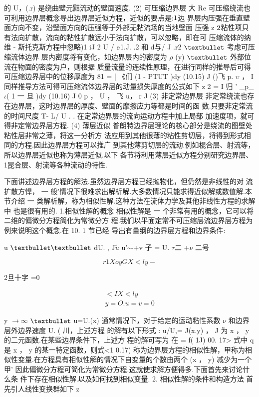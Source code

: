 的 U，(.r) 是绕曲壁元黠流动的壁面速度. (2) 可压缩边界层 大 Re 可压缩绕流也可利用边界层概念导出边界层近似方程，近似的要点是:${\rm 1}$边 界层内压强在垂直壁面方向不变，沿壁面方向的压强等于外部无粘流场的当地壁面 压强 z ${\rm 2}$粘性项只有法向扩散，流向的粘性扩散远小于法向扩散，可以忽略，即在可 压缩流体的纳维 - 斯托克斯方程中忽略)1 iJ 2 U / ${\rm e}$1.J. .2 和 d与/ J .r2 ${\rm •}$ 考虑可压缩流体边界 层内密度将有变化，如边界层内的密度为 $\rho$ (y) ${\rm •}$ 外部位流在物面的密度为户，则根据 质量流量的连续性原理，在进行同样的推导后可得可压缩边界层中的位移厚度为 81 = | 《们 (1 - PTUT )dy (10.15) J ()飞 p. $\upsilon$ ， I 同样推导方法可得可压缩流体边界层的动量损失厚度的公式如下 z 2 = I 归 ' \_p\_$\iota$( 1 一 旦 )dy (10.16) J 0 p ， U ， 飞 u， r J (3) 非定常边界层 非定常绕流也存在边界层，这时边界层的厚度、壁面的摩擦应力等都是时间的函 数.只要非定常流的时间尺度 T- L/ U . . 在定常边界层的流向运动方程中加上局部 加速度项，就可得非定常边界层方程. (4) 薄层近似 普朗特边界层理论的核心部分是绕流的图壁处粘性层非常之薄，将这一分析方 法应用到其他很薄的粘性剪切层，将得到形式相同的方程.因此边界层方程可以推广 到其他薄剪切层的流动.例如棍合层、射流等，所以边界层近似也称为薄层近似.以下 各节将利用薄层近似方程分别研究边界层、 1昆合层、射流等各种流动的特性.

下面讲述边界层方程的解法.虽然边界层方程已经抛物化，但仍然是非线性的对 流扩散方悍， 一 般'情况下很难求出解析解.大多数情况只能求得近似解或数值解.本 节介绍 一 类解析解，称为相似性解.这种方法在流体力学及其他非线性方程的求解中 也是很有用的. 1.相似性解的概念 相似性解是 一 个非常有用的概念，它可以将二维的偏微分方程简化为常微分方 程.我们以平面定常不可压缩层流边界层方程为例来说明这个概念.在 10. 1 节已经 导出有量纲的边界层方程和边界条件:

u ${\rm ••}$ dU. , J$\tilde{u}$ u'\textasciitilde{}-+v 子 = U. $\tau$二 +$\nu$ 二号

\[r1 X oy GX <l y-\]

2旦十字 =0

\begin{gather*}
<IX <l y\\
y = O. u = v = 0
\end{gather*}

y $\rightarrow$$\infty$ ${\rm •}$ u=U.(x) 通常情况下，对于给定的运动粘性系数 $\nu$ 和边界层外边界速度 U. ( 川，上述方程 的解有以下形式 : u/U,= J(x.y) ， J 为 x ， y 的二元函数.在某些边界条件下，上述方 程的解可写为 在 = f( 1J) 00. 17> 式中 q 是 x ， y 的某一特定函数，则式<1 0.17) 称为边界层方程的相似性解，甲称为相 似性变量.在方程具有相似性解的情况下自变量的个数由两个 (x ， y) 减少为一个甲' 因此偏微分方程可简化为常微分方程.这就使求解方便得多.下面首先来讨论什么条 件下存在相似性解.以及如何找到相似变量. 2. 相似性解的条件和构造方法 首先引人线性变换群如下 z


